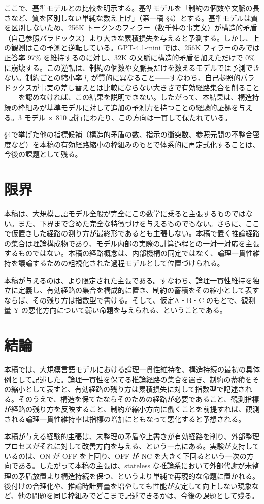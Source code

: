 \documentclass[12pt,a4paper]{article}
\begin{document}
ここで、基準モデルとの比較を明示する。基準モデルを「制約の個数や文脈の長さなど、質を区別しない単純な数え上げ」（第一稿 §4）とする。基準モデルは質を区別しないため、256K トークンのフィラー（数千件の事実文）が構造的矛盾（自己参照パラドックス）より大きな累積損失を与えると予測する。しかし、上の観測はこの予測と逆転している。GPT-4.1-mini では、256K フィラーのみでは正答率 97\% を維持するのに対し、32K の文脈に構造的矛盾を加えただけで 0\% に崩壊する。この逆転は、制約の個数や文脈長だけを数えるモデルでは予測できない。制約ごとの縮小率 \(l_{i}\) が質的に異なること------すなわち、自己参照的パラドックスが事実の差し替えとは比較にならない大きさで有効経路集合を削ること------を認めなければ、この結果を説明できない。したがって、本結果は、構造持続の枠組みが基準モデルに対して追加の予測力を持つことの経験的証拠を与える。3 モデル × 810 試行にわたり、この方向は一貫して保たれている。

§4で挙げた他の指標候補（構造的矛盾の数、指示の衝突数、参照元間の不整合密度など）を本稿の有効経路縮小の枠組みのもとで体系的に再定式化することは、今後の課題として残る。

\section{限界}\label{ux9650ux754c}

本稿は、大規模言語モデル全般が完全にこの数学に乗ると主張するものではない。また、下界まで含めた完全な特徴づけを与えるものでもない。さらに、ここで仮置きした経路の測り方が最終形であるとも主張しない。本稿で置く推論経路の集合は理論構成物であり、モデル内部の実際の計算過程との一対一対応を主張するものではない。本稿の経路概念は、内部機構の同定ではなく、論理一貫性維持を議論するための粗視化された過程モデルとして位置づけられる。

本稿が与えるのは、より限定された主張である。すなわち、論理一貫性維持を独立に定義し、有効経路の集合を構成的に置き、制約の蓄積をその縮小として表すならば、その残り方は指数型で書ける。そして、仮定A・B・C のもとで、観測量 Y の悪化方向について弱い命題を与えられる、ということである。

\section{結論}\label{ux7d50ux8ad6}

本稿では、大規模言語モデルにおける論理一貫性維持を、構造持続の最初の具体例として記述した。論理一貫性を保てる推論経路の集合を置き、制約の蓄積をその縮小として表すと、有効経路の残り方は累積損失に対して指数型で記述される。そのうえで、構造を保てたならそのための経路が必要であること、観測指標が経路の残り方を反映すること、制約が縮小方向に働くことを前提すれば、観測される論理一貫性維持率は指標の増加にともなって悪化すると予想される。

本稿が与える経験的主張は、未整理の矛盾や上書きが有効経路を削り、外部整理プロセスがそれに対して改善方向を与える、という一点にある。実験が支持しているのは、ON が OFF を上回り、OFF が NC を大きく下回るという一次の方向である。したがって本稿の主張は、stateless な推論系において外部代謝が未整理の矛盾放置より構造持続を保つ、というより単純で再現的な命題に置かれる。後付けの合理化や、推論時計算量を増やしても性能が安定して向上しない現象など、他の問題を同じ枠組みでどこまで記述できるかは、今後の課題として残る。
\end{document}
